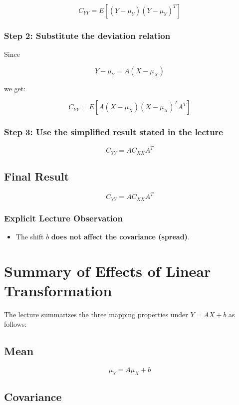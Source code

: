 \documentclass[12pt]{article}
\begin{document}
\[
C_{YY} = E[(Y - \mu_Y)(Y - \mu_Y)^T]
\]

\subsubsection*{Step 2: Substitute the deviation relation}

Since

\[
Y - \mu_Y = A(X - \mu_X)
\]

we get:

\[
C_{YY} = E\left[A(X - \mu_X)(X - \mu_X)^T A^T\right]
\]

\subsubsection*{Step 3: Use the simplified result stated in the lecture}

\[
C_{YY} = A C_{XX} A^T
\]

\subsection{Final Result}

\[
\boxed{C_{YY} = A C_{XX} A^T}
\]

\subsubsection*{Explicit Lecture Observation}

\begin{itemize}
    \item The shift \(b\) \textbf{does not affect the covariance (spread)}.
\end{itemize}

\section{Summary of Effects of Linear Transformation}

The lecture summarizes the three mapping properties under \(Y = AX + b\) as follows:

\subsection{Mean}

\[
\boxed{\mu_Y = A\mu_X + b}
\]

\subsection{Covariance}
\end{document}

